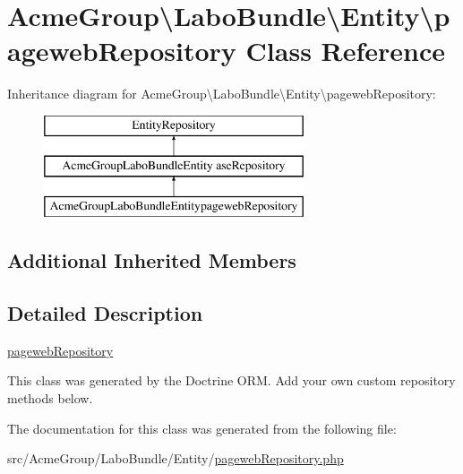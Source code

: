 \hypertarget{class_acme_group_1_1_labo_bundle_1_1_entity_1_1pageweb_repository}{\section{Acme\+Group\textbackslash{}Labo\+Bundle\textbackslash{}Entity\textbackslash{}pageweb\+Repository Class Reference}
\label{class_acme_group_1_1_labo_bundle_1_1_entity_1_1pageweb_repository}
}
Inheritance diagram for Acme\+Group\textbackslash{}Labo\+Bundle\textbackslash{}Entity\textbackslash{}pageweb\+Repository\+:\begin{figure}[H]
\begin{center}
\leavevmode
\includegraphics[height=3.000000cm]{class_acme_group_1_1_labo_bundle_1_1_entity_1_1pageweb_repository}
\end{center}
\end{figure}
\subsection*{Additional Inherited Members}


\subsection{Detailed Description}
\hyperlink{class_acme_group_1_1_labo_bundle_1_1_entity_1_1pageweb_repository}{pageweb\+Repository}

This class was generated by the Doctrine O\+R\+M. Add your own custom repository methods below. 

The documentation for this class was generated from the following file\+:\begin{DoxyCompactItemize}
\item 
src/\+Acme\+Group/\+Labo\+Bundle/\+Entity/\hyperlink{pageweb_repository_8php}{pageweb\+Repository.\+php}\end{DoxyCompactItemize}
